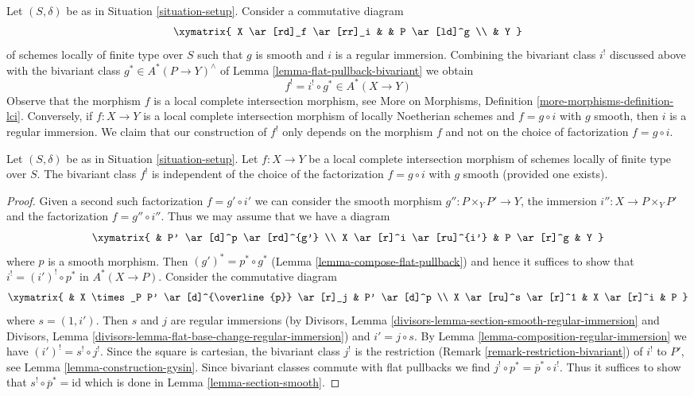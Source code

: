 \noindent
Let $(S, \delta)$ be as in Situation \ref{situation-setup}. Consider a
commutative diagram
$$
\xymatrix{
X \ar[rd]_f \ar[rr]_i & & P \ar[ld]^g \\
& Y
}
$$
of schemes locally of finite type over $S$ such that $g$ is smooth
and $i$ is a regular immersion. Combining the bivariant class
$i^!$ discussed above with the bivariant class $g^* \in A^*(P \to Y)^\wedge$
of Lemma \ref{lemma-flat-pullback-bivariant} we obtain
$$
f^! = i^! \circ g^* \in A^*(X \to Y)
$$
Observe that the morphism $f$ is a local complete intersection morphism, see
More on Morphisms, Definition \ref{more-morphisms-definition-lci}.
Conversely, if $f : X \to Y$ is a local complete intersection morphism
of locally Noetherian schemes and $f = g \circ i$ with $g$ smooth, then
$i$ is a regular immersion. We claim that our construction of $f^!$
only depends on the morphism $f$ and not on the choice of factorization
$f = g \circ i$.

\begin{lemma}
\label{lemma-lci-gysin-well-defined}
Let $(S, \delta)$ be as in Situation \ref{situation-setup}.
Let $f : X \to Y$ be a local complete intersection morphism
of schemes locally of finite type over $S$.
The bivariant class $f^!$ is independent of the choice of
the factorization $f = g \circ i$ with $g$ smooth (provided
one exists).
\end{lemma}

\begin{proof}
Given a second such factorization $f = g' \circ i'$ we can
consider the smooth morphism $g'' : P \times_Y P' \to Y$, the
immersion $i'' : X \to P \times_Y P'$ and the factorization
$f = g'' \circ i''$. Thus we may assume that we have a diagram
$$
\xymatrix{
& P' \ar[d]^p \ar[rd]^{g'} \\
X \ar[r]^i \ar[ru]^{i'} & P \ar[r]^g & Y
}
$$
where $p$ is a smooth morphism. Then $(g')^* = p^* \circ g^*$
(Lemma \ref{lemma-compose-flat-pullback}) and hence it suffices
to show that $i^! = (i')^! \circ p^*$
in $A^*(X \to P)$. Consider the commutative diagram
$$
\xymatrix{
& X \times_P P' \ar[d]^{\overline{p}} \ar[r]_j & P' \ar[d]^p \\
X \ar[ru]^s \ar[r]^1 & X \ar[r]^i & P
}
$$
where $s =(1, i')$. Then $s$ and $j$ are regular immersions
(by Divisors, Lemma \ref{divisors-lemma-section-smooth-regular-immersion}
and Divisors, Lemma \ref{divisors-lemma-flat-base-change-regular-immersion})
and $i' = j \circ s$. By Lemma \ref{lemma-composition-regular-immersion}
we have $(i')^! = s^! \circ j^!$.
Since the square is cartesian, the bivariant class $j^!$
is the restriction (Remark \ref{remark-restriction-bivariant})
of $i^!$ to $P'$, see Lemma \ref{lemma-construction-gysin}.
Since bivariant classes commute with flat pullbacks
we find $j^! \circ p^* = \overline{p}^* \circ i^!$.
Thus it suffices to show that $s^! \circ \overline{p}^* = \text{id}$
which is done in Lemma \ref{lemma-section-smooth}.
\end{proof}

